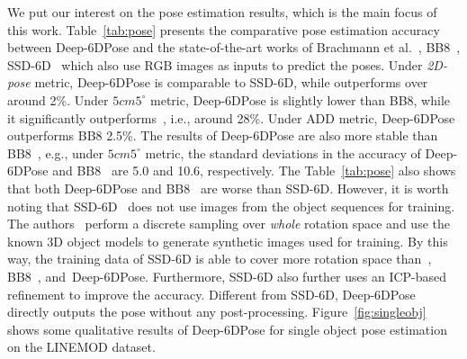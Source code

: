 \documentclass[conference]{IEEEtran}
\newcommand\red[1]{{\color{black}#1}}
\newcommand{\method}[1]{Deep-6DPose}
\begin{document}
We put our interest on the pose estimation results, which is the main focus of this work. 
Table~\ref{tab:pose} presents the comparative pose estimation accuracy between \method{} and the state-of-the-art works of Brachmann et al.~\cite{CVPR16}, BB8~\cite{BB8}, SSD-6D~\cite{SSD-6D} which also use RGB images as inputs to predict the poses. Under \textit{2D-pose} metric, \method{} is comparable to SSD-6D, while outperforms over \cite{CVPR16} around \red{2\%}.
Under $5cm5^\circ$ metric, \method{} is slightly lower than BB8, while it significantly outperforms~\cite{CVPR16}, i.e., around \red{28\%}. Under $\textrm{ADD}$ metric, \method{} outperforms BB8 \red{2.5\%}. %
The results of \method{} are also more stable than BB8~\cite{BB8}, e.g., under $5cm5^\circ$ metric, the standard deviations in the accuracy of \method{} and BB8~\cite{BB8} are \red{5.0} and \red{10.6}, respectively. 
The Table~\ref{tab:pose} also shows that both \method{} and BB8~\cite{BB8} are worse than SSD-6D. However, it is worth noting that SSD-6D~\cite{SSD-6D} does not use images from the object sequences for training. 
The authors~\cite{SSD-6D} perform a discrete sampling over \textit{whole} rotation space and use the known 3D object models to generate synthetic images used for training. By this way, the training data of SSD-6D is able to cover more rotation space than~\cite{CVPR16}, BB8~\cite{BB8}, and~\method{}. 
Furthermore, SSD-6D also further uses an ICP-based refinement to improve the accuracy. Different from SSD-6D, \method{} directly outputs the pose without any post-processing. 
Figure~\ref{fig:singleobj} shows some qualitative results of \method{} for single object pose estimation on the LINEMOD dataset. %
\end{document}
